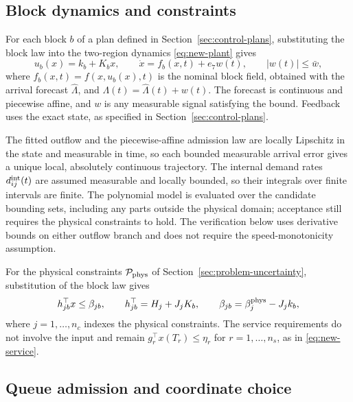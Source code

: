 \documentclass[final]{cas-sc}
\theoremstyle{definition}
\theoremstyle{plain}
\theoremstyle{definition}
\theoremstyle{plain}
\begin{document}
\subsection{Block dynamics and constraints}
\label{sec:verification-block-data}

For each block $b$ of a plan defined in
Section~\ref{sec:control-plans}, substituting the block law into the
two-region dynamics \eqref{eq:new-plant} gives
\begin{equation}
u_b(x)=k_b+K_bx,\qquad
\dot x=f_b(x,t)+e_7w(t),\qquad |w(t)|\le\bar w,
\label{eq:new-plan-data}
\end{equation}
where $f_b(x,t)=f(x,u_b(x),t)$ is the nominal block field, obtained
with the arrival forecast $\widehat\Lambda$, and
$\Lambda(t)=\widehat\Lambda(t)+w(t)$. The forecast is continuous and
piecewise affine, and $w$ is any measurable signal satisfying the
bound. Feedback uses the exact state, as specified in
Section~\ref{sec:control-plans}.

The fitted outflow and the piecewise-affine admission law are locally
Lipschitz in the state and measurable in time, so each bounded
measurable arrival error gives a unique local, absolutely continuous
trajectory. The internal demand rates $d_{ij}^{\rm int}(t)$ are assumed
measurable and locally bounded, so their integrals over finite
intervals are finite. The polynomial model is evaluated over the candidate
bounding sets, including any parts outside the physical domain;
acceptance still requires the physical constraints to hold. The
verification below uses derivative bounds on either outflow branch and
does not require the speed-monotonicity assumption.

For the physical constraints $\mathcal P_{\rm phys}$ of
Section~\ref{sec:problem-uncertainty}, substitution of the block law gives
\begin{equation}
h_{jb}^\top x\le\beta_{jb},\qquad
h_{jb}^\top=H_j+J_jK_b,\qquad
\beta_{jb}=\beta_j^{\rm phys}-J_jk_b,
\label{eq:new-physical-rows}
\end{equation}
where $j=1,\ldots,n_c$ indexes the physical constraints. The service
requirements do not involve the input and remain
$g_r^\top x(T_r)\le\eta_r$ for $r=1,\ldots,n_s$, as in
\eqref{eq:new-service}.

\subsection{Queue admission and coordinate choice}
\label{sec:coordinate-choices}
\end{document}
